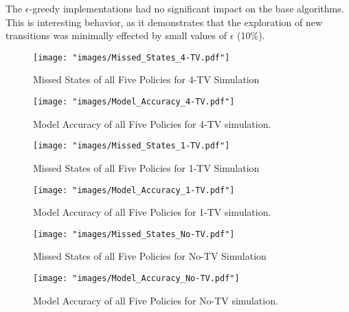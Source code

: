 \documentclass[letterpaper]{article} %
\begin{document}
The $\epsilon$-greedy implementations had no significant impact on the base algorithms. This is interesting behavior, as it demonstrates that the exploration of new transitions was minimally effected by small values of $\epsilon$ (10\%).


\begin{figure}[p]
	\begin{center}
		\texttt{[image: "images/Missed\_States\_4-TV.pdf"]}
	\end{center}
	\caption{Missed States of all Five Policies for 4-TV Simulation}
	\label{Fig:MSFP4TV}
\end{figure}
\begin{figure}
	\begin{center}
		\texttt{[image: "images/Model\_Accuracy\_4-TV.pdf"]}
	\end{center}
	\caption{Model Accuracy of all Five Policies for 4-TV simulation.}
	\label{Fig:MAFP4TV}
\end{figure}

\begin{figure}[p]
	\begin{center}
		\texttt{[image: "images/Missed\_States\_1-TV.pdf"]}
	\end{center}
	\caption{Missed States of all Five Policies for 1-TV Simulation}
	\label{Fig:MSFP1TV}
\end{figure}
\begin{figure}
	\begin{center}
		\texttt{[image: "images/Model\_Accuracy\_1-TV.pdf"]}
	\end{center}
	\caption{Model Accuracy of all Five Policies for 1-TV simulation.}
	\label{Fig:MAFP1TV}
\end{figure}

\begin{figure}[p]
	\begin{center}
		\texttt{[image: "images/Missed\_States\_No-TV.pdf"]}
	\end{center}
	\caption{Missed States of all Five Policies for No-TV Simulation}
	\label{Fig:MSFP0TV}
\end{figure}
\begin{figure}
	\begin{center}
		\texttt{[image: "images/Model\_Accuracy\_No-TV.pdf"]}
	\end{center}
	\caption{Model Accuracy of all Five Policies for No-TV simulation.}
	\label{Fig:MAFP0TV}
\end{figure}
\end{document}

